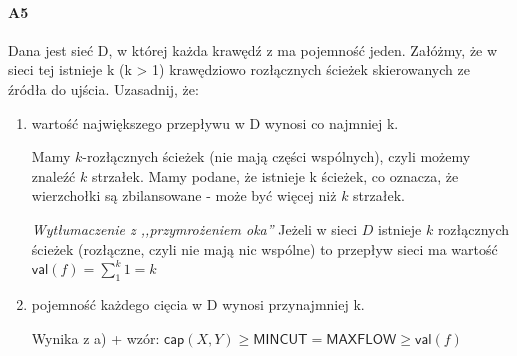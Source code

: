 \paragraph{A5} Dana jest sieć D, w której każda krawędź z ma pojemność jeden. Załóżmy, że w sieci tej istnieje k
(k > 1) krawędziowo rozłącznych ścieżek skierowanych ze źródła do ujścia. Uzasadnij, że:
\begin{enumerate}[label=\alph*)]
\item wartość największego przepływu w D wynosi co najmniej k.

Mamy $k$-rozłącznych ścieżek (nie mają części wspólnych), czyli możemy znaleźć $k$ strzałek. Mamy podane, że istnieje k ścieżek, co oznacza, że wierzchołki są zbilansowane - może być więcej niż $k$ strzałek.

\textit{Wytłumaczenie z ,,przymrożeniem oka''}
Jeżeli w sieci $D$ istnieje $k$ rozłącznych ścieżek (rozłączne, czyli nie mają nic wspólne) to przepływ sieci ma wartość $\mathsf{val}(f)=\sum _1^k 1 = k$
\item pojemność każdego cięcia w D wynosi przynajmniej k.

Wynika z a) + wzór: $\mathsf{cap}(X,Y)\geq \mathsf{MINCUT}=\mathsf{MAXFLOW}\geq \mathsf{val}(f)$
\end{enumerate}


